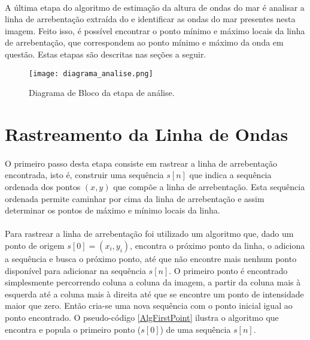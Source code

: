 \paragraph{}A última etapa do algoritmo de estimação da altura de ondas do mar é analisar a linha de arrebentação extraída do \timestack e identificar as ondas do mar presentes nesta imagem. Feito isso, é possível encontrar o ponto mínimo e máximo locais da linha de arrebentação, que correspondem ao ponto mínimo e máximo da onda em questão. Estas etapas são descritas nas seções a seguir.

\begin{figure}[h]
\begin{center}
  \texttt{[image: diagrama\_analise.png]}
  \caption[\small{Diagrama de Bloco da etapa de análise. Fonte: Autor}]{\label{FigDiagramaAnalise} \small{Diagrama de Bloco da etapa de análise.}}
\end{center}
\end{figure}

\section{Rastreamento da Linha de Ondas}

\paragraph{}O primeiro passo desta etapa consiste em rastrear a linha de arrebentação encontrada, isto é, construir uma sequência \(s[n]\) que indica a sequência ordenada dos pontos \((x,y)\) que compõe a linha de arrebentação. Esta sequência ordenada permite caminhar por cima da linha de arrebentação e assim determinar os pontos de máximo e mínimo locais da linha.

\paragraph{}Para rastrear a linha de arrebentação foi utilizado um algoritmo que, dado um ponto de origem \(s[0] = (x_{i},y_{i})\), encontra o próximo ponto da linha, o adiciona a sequência e busca o próximo ponto, até que não encontre mais nenhum ponto disponível para adicionar na sequência \(s[n]\). O primeiro ponto é encontrado simplesmente percorrendo coluna a coluna da imagem, a partir da coluna mais à esquerda até a coluna mais à direita até que se encontre um ponto de intensidade maior que zero. Então cria-se uma nova sequência com o ponto inicial igual ao ponto encontrado. O pseudo-código \ref{AlgFirstPoint} ilustra o algoritmo que encontra e popula o primeiro ponto ($s[0]$) de uma sequência $s[n]$. 

